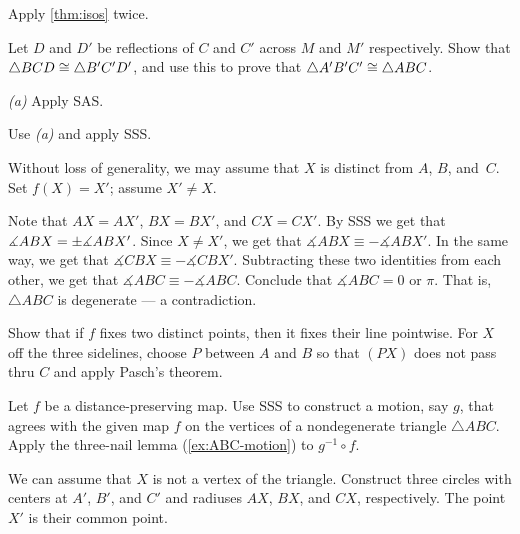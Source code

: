 Apply \ref{thm:isos} twice.

Let $D$ and $D'$ be reflections of $C$ and $C'$ across $M$ and $M'$ respectively.
Show that $\triangle BCD\z\cong \triangle B'C'D'$, and use this to prove that $\triangle A' B' C'\z\cong\triangle A B C$.

 \textit{(a)} Apply SAS.

 Use \textit{(a)} and apply SSS.

Without loss of generality, we may assume that $X$ is distinct from $A$, $B$, and~$C$.
Set $f(X)=X'$; assume $X'\ne X$.

Note that $AX=AX'$, $BX=BX'$, and $CX=CX'$.
By SSS we get that $\measuredangle ABX\z=\pm\measuredangle ABX'$.
Since $X\ne X'$, we get that
$\measuredangle ABX\equiv - \measuredangle ABX'$.
In the same way, we get that 
$\measuredangle CBX\equiv - \measuredangle CBX'$.
Subtracting these two identities from each other, we get that
$\measuredangle ABC\equiv -\measuredangle ABC$.
Conclude that $\measuredangle ABC=0$ or $\pi$.
That is, $\triangle ABC$ is degenerate --- a contradiction. 

Show that if $f$ fixes two distinct points, then it fixes their line pointwise.
For $X$ off the three sidelines, choose $P$ between $A$ and $B$ so that $(PX)$ does not pass thru $C$ and apply Pasch's theorem.

Let $f$ be a distance-preserving map.
Use SSS to construct a motion, say $g$, that agrees with the given map $f$ on the vertices of a nondegenerate triangle $\triangle ABC$.
Apply the three-nail lemma (\ref{ex:ABC-motion}) to $g^{-1}\circ f$.

We can assume that $X$ is not a vertex of the triangle.
Construct three circles with centers at $A'$, $B'$, and $C'$ and radiuses $AX$, $BX$, and $CX$, respectively.
The point $X'$ is their common point.


\setcounter{eqtn}{0}


